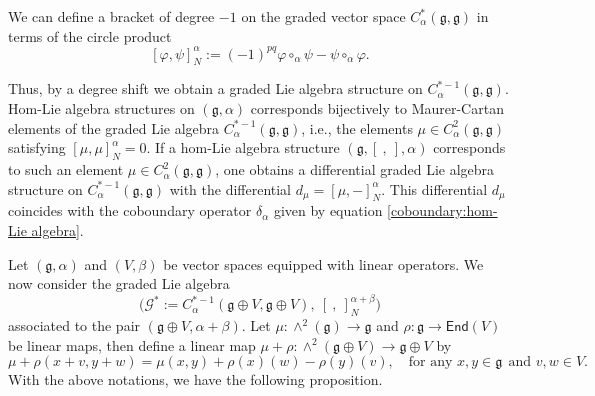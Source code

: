 \documentclass[a4paper,11pt]{amsart}
\theoremstyle{plain}
\theoremstyle{definition}
\theoremstyle{remark}
\numberwithin{equation}{section}
\begin{document}
We can define a bracket of degree $-1$ on the graded vector space $C^*_{\alpha}(\mathfrak{g},\mathfrak{g})$ in terms of the circle product
\begin{equation}\label{GLB}
[\varphi, \psi]_N^{\alpha} := (-1)^{pq} \varphi \circ_{\alpha} \psi - \psi \circ_{\alpha} \varphi.
\end{equation}

Thus, by a degree shift we obtain a graded Lie algebra structure on $C^{*-1}_{\alpha}(\mathfrak{g},\mathfrak{g})$. Hom-Lie algebra structures on $(\mathfrak{g},\alpha)$  corresponds bijectively to Maurer-Cartan elements of the graded Lie algebra $C^{*-1}_{\alpha}(\mathfrak{g},\mathfrak{g})$, i.e., the elements $\mu\in C^{2}_{\alpha}(\mathfrak{g},\mathfrak{g})$ satisfying $[\mu,\mu]_N^{\alpha}=0$. If a hom-Lie algebra structure $(\mathfrak{g},[~,~],\alpha)$ corresponds to such an element $\mu\in C^{2}_{\alpha}(\mathfrak{g},\mathfrak{g})$, one obtains a differential graded Lie algebra structure on $C^{*-1}_{\alpha}(\mathfrak{g},\mathfrak{g})$ with the differential $d_{\mu}=[\mu,-]_N^{\alpha}$. This differential $d_{\mu}$ coincides with the coboundary operator $\delta_{\alpha}$ given by equation \eqref{coboundary:hom-Lie algebra}.

Let $(\mathfrak{g},\alpha)$ and $(V,\beta)$ be vector spaces equipped with linear operators. We now consider the graded Lie algebra 
$$\textstyle{\big(\mathcal{G}^*:=C^{*-1}_{\alpha}(\mathfrak{g}\oplus V,\mathfrak{g}\oplus V),~[~,~]_N^{\alpha+\beta}\big)}$$ 
associated to the pair $(\mathfrak{g}\oplus V,\alpha+\beta)$. Let $\mu: \wedge^2(\mathfrak{g})\rightarrow\mathfrak{g}$ and $\rho:\mathfrak{g}\rightarrow \mathsf{End}(V)$ be linear maps, then define a linear map $\mu+\rho:\wedge^2(\mathfrak{g}\oplus V)\rightarrow \mathfrak{g}\oplus V$ by
$$\mu+\rho(x+v,y+w)=\mu(x,y)+\rho(x)(w)-\rho(y)(v),\quad \mbox{for any }x,y\in \mathfrak{g}~~\mbox{and }v,w\in V.$$
With the above notations, we have the following proposition.
\end{document}
